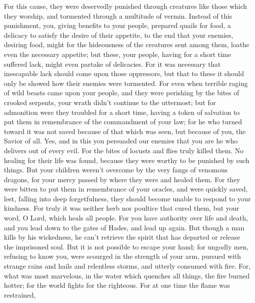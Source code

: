  For this cause, they were deservedly punished through
creatures like those which they worship, and tormented through a
multitude of vermin.  Instead of this punishment, you,
giving benefits to your people, prepared quails for food, a delicacy to
satisfy the desire of their appetite,  to the end that
your enemies, desiring food, might for the hideousness of the creatures
sent among them, loathe even the necessary appetite; but these, your
people, having for a short time suffered lack, might even partake of
delicacies.  For it was necessary that inescapable lack
should come upon those oppressors, but that to these it should only be
showed how their enemies were tormented.  For even when
terrible raging of wild beasts came upon your people, and they were
perishing by the bites of crooked serpents, your wrath didn't continue
to the uttermost;  but for admonition were they troubled
for a short time, having a token of salvation to put them in remembrance
of the commandment of your law;  for he who turned toward
it was not saved because of that which was seen, but because of you, the
Savior of all.  Yes, and in this you persuaded our enemies
that you are he who delivers out of every evil.  For the
bites of locusts and flies truly killed them. No healing for their life
was found, because they were worthy to be punished by such things.
 But your children weren't overcome by the very fangs of
venomous dragons, for your mercy passed by where they were and healed
them.  For they were bitten to put them in remembrance of
your oracles, and were quickly saved, lest, falling into deep
forgetfulness, they should become unable to respond to your kindness.
 For truly it was neither herb nor poultice that cured
them, but your word, O Lord, which heals all people.  For
you have authority over life and death, and you lead down to the gates
of Hades, and lead up again.  But though a man kills by
his wickedness, he can't retrieve the spirit that has departed or
release the imprisoned soul.  But it is not possible to
escape your hand;  for ungodly men, refusing to know you,
were scourged in the strength of your arm, pursued with strange rains
and hails and relentless storms, and utterly consumed with fire.
 For, what was most marvelous, in the water which
quenches all things, the fire burned hotter; for the world fights for
the righteous.  For at one time the flame was restrained,
